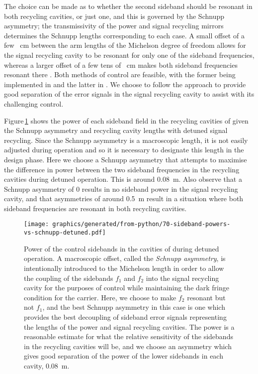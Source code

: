 The choice can be made as to whether the second sideband should be resonant in both recycling cavities, or just one, and this is governed by the Schnupp asymmetry; the transmissivity of the power and signal recycling mirrors determines the Schnupp lengths corresponding to each case. A small offset of a few \SI{}{\centi\meter} between the arm lengths of the Michelson degree of freedom allows for the signal recycling cavity to be resonant for only one of the sideband frequencies, whereas a larger offset of a few tens of \SI{}{\centi\meter} makes both sideband frequencies resonant there \cite{Vajente2008}. Both methods of control are feasible, with the former being implemented in \ALIGO{} \cite{Abbott2010} and the latter in \KAGRA{} \cite{kagra2013}. We choose to follow the \ALIGO{} approach to provide good separation of the error signals in the signal recycling cavity to assist with its challenging control.

Figure\,\ref{fig:sideband-powers-vs-schnupp-detuned} shows the power of each sideband field in the recycling cavities of \ETLF{} given the Schnupp asymmetry and recycling cavity lengths with detuned signal recycling. Since the Schnupp asymmetry is a macroscopic length, it is not easily adjusted during operation and so it is necessary to designate this length in the design phase. Here we choose a Schnupp asymmetry that attempts to maximise the difference in power between the two sideband frequencies in the recycling cavities during detuned operation. This is around \SI{0.08}{\meter}. Also observe that a Schnupp asymmetry of \num{0} results in no sideband power in the signal recycling cavity, and that asymmetries of around \SI{0.5}{\meter} result in a situation where both sideband frequencies are resonant in both recycling cavities.

\begin{figure}
  \centering
  \texttt{[image: graphics/generated/from-python/70-sideband-powers-vs-schnupp-detuned.pdf]}
  \caption[Power of the control sidebands in the cavities of \ETLF{} in the detuned configuration]{\label{fig:sideband-powers-vs-schnupp-detuned}Power of the control sidebands in the cavities of \ETLF{} during detuned operation. A macroscopic offset, called the \emph{Schnupp asymmetry}, is intentionally introduced to the Michelson length in order to allow the coupling of the sidebands $f_1$ and $f_2$ into the signal recycling cavity for the purposes of control while maintaining the dark fringe condition for the carrier. Here, we choose to make $f_2$ resonant but not $f_1$, and the best Schnupp asymmetry in this case is one which provides the best decoupling of sideband error signals representing the lengths of the power and signal recycling cavities. The power is a reasonable estimate for what the relative sensitivity of the sidebands in the recycling cavities will be, and we choose an asymmetry which gives good separation of the power of the lower sidebands in each cavity, \SI{0.08}{\meter}.}
\end{figure}

